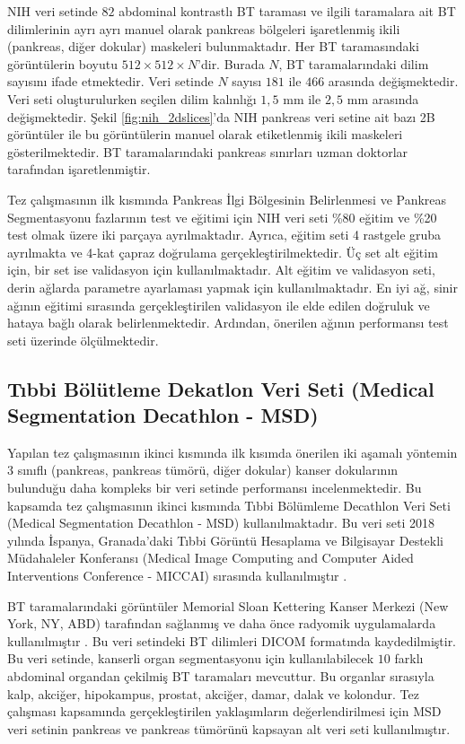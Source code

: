 NIH veri setinde $82$ abdominal kontrastlı BT taraması ve ilgili taramalara ait BT dilimlerinin ayrı ayrı manuel olarak pankreas bölgeleri işaretlenmiş ikili (pankreas, diğer dokular) maskeleri bulunmaktadır. Her BT taramasındaki görüntülerin boyutu $512 \times 512 \times N$’dir. Burada $N$, BT taramalarındaki dilim sayısını ifade etmektedir. Veri setinde $N$ sayısı $181$ ile $466$ arasında değişmektedir. Veri seti oluşturulurken seçilen dilim kalınlığı $1,5$ mm ile $2,5$ mm arasında değişmektedir. Şekil \ref{fig:nih_2dslices}’da NIH pankreas veri setine ait bazı 2B görüntüler ile bu görüntülerin manuel olarak etiketlenmiş ikili maskeleri gösterilmektedir. BT taramalarındaki pankreas sınırları uzman doktorlar tarafından işaretlenmiştir. 

Tez çalışmasının ilk kısmında Pankreas İlgi Bölgesinin Belirlenmesi ve Pankreas Segmentasyonu fazlarının test ve eğitimi için NIH veri seti \%80 eğitim ve \%20 test olmak üzere iki parçaya ayrılmaktadır. Ayrıca, eğitim seti 4 rastgele gruba ayrılmakta ve 4-kat çapraz doğrulama gerçekleştirilmektedir. Üç set alt eğitim için, bir set ise validasyon için kullanılmaktadır. Alt eğitim ve validasyon seti, derin ağlarda parametre ayarlaması yapmak için kullanılmaktadır. En iyi ağ, sinir ağının eğitimi sırasında gerçekleştirilen validasyon ile elde edilen doğruluk ve hataya bağlı olarak belirlenmektedir. Ardından, önerilen ağının performansı test seti üzerinde ölçülmektedir.

\subsection{Tıbbi Bölütleme Dekatlon Veri Seti (Medical Segmentation Decathlon - MSD)}

Yapılan tez çalışmasının ikinci kısmında ilk kısımda önerilen iki aşamalı yöntemin 3 sınıflı (pankreas, pankreas tümörü, diğer dokular) kanser dokularının bulunduğu daha kompleks bir veri setinde performansı incelenmektedir. Bu kapsamda tez çalışmasının ikinci kısmında Tıbbi Bölümleme Decathlon Veri Seti (Medical Segmentation Decathlon - MSD) kullanılmaktadır. Bu veri seti  2018 yılında İspanya, Granada'daki Tıbbi Görüntü Hesaplama ve Bilgisayar Destekli Müdahaleler Konferansı (Medical Image Computing and Computer Aided Interventions Conference - MICCAI) sırasında kullanılmıştır \cite{simpson2019large}. 

BT taramalarındaki görüntüler Memorial Sloan Kettering Kanser Merkezi (New York, NY, ABD) tarafından sağlanmış ve daha önce radyomik uygulamalarda kullanılmıştır \cite{attiyeh2018survival,attiyeh2019preoperative,chakraborty2018ct}. Bu veri setindeki BT dilimleri DICOM formatında kaydedilmiştir. Bu veri setinde, kanserli organ segmentasyonu için kullanılabilecek $10$ farklı abdominal organdan çekilmiş BT taramaları mevcuttur. Bu organlar sırasıyla kalp, akciğer, hipokampus, prostat, akciğer, damar, dalak ve kolondur. Tez çalışması kapsamında gerçekleştirilen yaklaşımların değerlendirilmesi için MSD veri setinin pankreas ve pankreas tümörünü kapsayan alt veri seti kullanılmıştır. 

